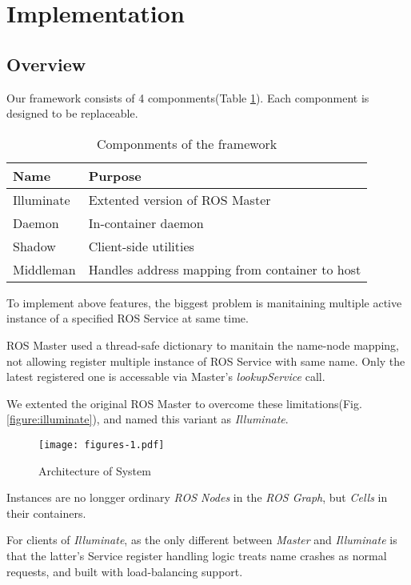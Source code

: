 
\section{Implementation}

\subsection{Overview}

Our framework consists of 4 componments(Table \ref{table:componments}).
Each componment is designed to be replaceable.

\begin{table}[H]
  \renewcommand{\arraystretch}{1.3}
  \caption{Componments of the framework}
  \label{table:componments}
  \centering
  \begin{tabular}{ll}
     \hline
     \bfseries Name & \bfseries Purpose \\
     \hline
     Illuminate & Extented version of ROS Master \\ 
     Daemon     & In-container daemon \\
     Shadow     & Client-side utilities \\
     Middleman  & Handles address mapping from container to host \\
     \hline
  \end{tabular}
\end{table} 

To implement above features, the biggest problem is manitaining multiple active
instance of a specified ROS Service at same time.

ROS Master used a thread-safe dictionary to manitain the name-node mapping,
not allowing register multiple instance of ROS Service with same name.
Only the latest registered one is accessable via Master's \emph{lookupService} call.

We extented the original ROS Master to overcome these limitations(Fig.\ref{figure:illuminate}),
and named this variant as \emph{Illuminate}.
\begin{figure}[!t]
\centering
\texttt{[image: figures-1.pdf]}
\caption{Architecture of System}
\label{figure:aoss}
\end{figure}

Instances are no longger ordinary \emph{ROS Nodes} in the \emph{ROS Graph},
but \emph{Cells} in their containers.

For clients of \emph{Illuminate}, as the only different between \emph{Master} and \emph{Illuminate}
is that the latter's Service register handling logic treats name crashes as normal requests, 
and built with load-balancing support.

